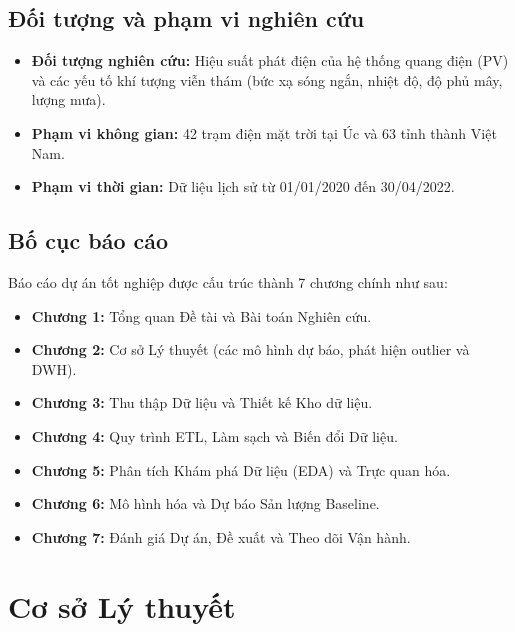 \documentclass[12pt, a4paper]{report}
\begin{document}
\section{Đối tượng và phạm vi nghiên cứu}
\label{sec:phamvi}

\begin{itemize}[noitemsep]
    \item \textbf{Đối tượng nghiên cứu:} Hiệu suất phát điện của hệ thống quang điện (PV) và các yếu tố khí tượng viễn thám (bức xạ sóng ngắn, nhiệt độ, độ phủ mây, lượng mưa).
    \item \textbf{Phạm vi không gian:} 42 trạm điện mặt trời tại Úc và 63 tỉnh thành Việt Nam.
    \item \textbf{Phạm vi thời gian:} Dữ liệu lịch sử từ 01/01/2020 đến 30/04/2022.
\end{itemize}

\section{Bố cục báo cáo}
\label{sec:bocuc}

Báo cáo dự án tốt nghiệp được cấu trúc thành 7 chương chính như sau:
\begin{itemize}[noitemsep]
    \item \textbf{Chương 1:} Tổng quan Đề tài và Bài toán Nghiên cứu.
    \item \textbf{Chương 2:} Cơ sở Lý thuyết (các mô hình dự báo, phát hiện outlier và DWH).
    \item \textbf{Chương 3:} Thu thập Dữ liệu và Thiết kế Kho dữ liệu.
    \item \textbf{Chương 4:} Quy trình ETL, Làm sạch và Biến đổi Dữ liệu.
    \item \textbf{Chương 5:} Phân tích Khám phá Dữ liệu (EDA) và Trực quan hóa.
    \item \textbf{Chương 6:} Mô hình hóa và Dự báo Sản lượng Baseline.
    \item \textbf{Chương 7:} Đánh giá Dự án, Đề xuất và Theo dõi Vận hành.
\end{itemize}


\chapter{Cơ sở Lý thuyết}
\label{chap:lythuyet}
\end{document}
